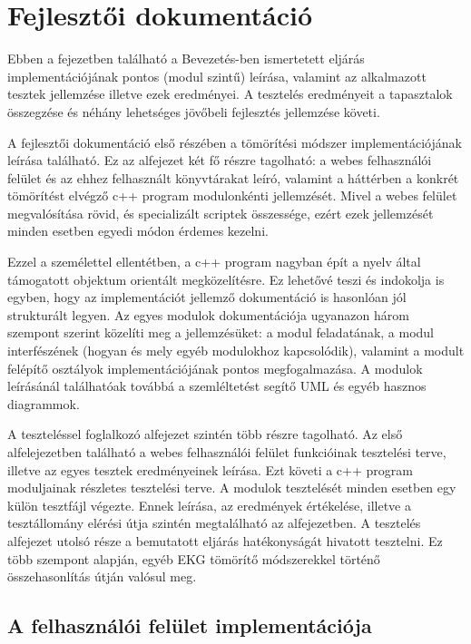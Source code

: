 \documentclass[oneside,titlepage,12pt,a4paper]{report}
\begin{document}
\chapter{Fejlesztői dokumentáció}

Ebben a fejezetben található a Bevezetés-ben ismertetett eljárás implementációjának pontos (modul szintű) leírása, valamint az alkalmazott tesztek jellemzése illetve ezek eredményei. A tesztelés eredményeit a tapasztalok összegzése és néhány lehetséges jövőbeli fejlesztés jellemzése követi. \par A fejlesztői dokumentáció első részében a tömörítési módszer implementációjának leírása található. Ez az alfejezet két fő részre tagolható: a webes felhasználói felület és az ehhez felhasznált könyvtárakat leíró, valamint a háttérben a konkrét tömörítést elvégző c++ program modulonkénti jellemzését. Mivel a webes felület megvalósítása rövid, és specializált scriptek összessége, ezért ezek jellemzését minden esetben egyedi módon érdemes kezelni. 
\par Ezzel a személettel ellentétben, a c++ program nagyban épít a nyelv által támogatott objektum orientált megközelítésre. Ez lehetővé teszi és indokolja is egyben, hogy az implementációt jellemző dokumentáció is hasonlóan jól strukturált legyen. Az egyes modulok dokumentációja ugyanazon három szempont szerint közelíti meg a jellemzésüket: a modul feladatának, a modul interfészének (hogyan és mely egyéb modulokhoz kapcsolódik), valamint a modult felépítő osztályok implementációjának pontos megfogalmazása. A modulok leírásánál találhatóak továbbá a szemléltetést segítő UML és egyéb hasznos diagrammok. 
\par  A teszteléssel foglalkozó alfejezet szintén több részre tagolható. Az első alfelejezetben található a webes felhasználói felület funkcióinak tesztelési terve, illetve az egyes tesztek eredményeinek leírása. Ezt követi a c++ program moduljainak részletes tesztelési terve. A modulok tesztelését minden esetben egy külön tesztfájl végezte. Ennek leírása, az eredmények értékelése, illetve a tesztállomány elérési útja szintén megtalálható az alfejezetben. A  tesztelés alfejezet utolsó része a bemutatott eljárás hatékonyságát hivatott tesztelni. Ez több szempont alapján, egyéb EKG tömörítő módszerekkel történő összehasonlítás útján valósul meg. 

\section{A felhasználói felület implementációja}
\end{document}
